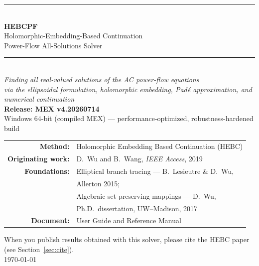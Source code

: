 \documentclass[11pt,a4paper]{article}
\begin{document}
\begin{titlepage}
\centering
\vspace*{2.2cm}
{\color{rule}\rule{\textwidth}{1.2pt}}\\[8pt]
{\Huge\bfseries HEBCPF}\\[10pt]
{\LARGE Holomorphic-Embedding-Based Continuation}\\[4pt]
{\LARGE Power-Flow All-Solutions Solver}\\[10pt]
{\color{rule}\rule{\textwidth}{1.2pt}}\\[18pt]
{\large\itshape Finding \emph{all} real-valued solutions of the AC power-flow equations}\\[6pt]
{\large\itshape via the ellipsoidal formulation, holomorphic embedding, Pad\'e approximation, and numerical continuation}\\[26pt]

{\large\bfseries Release: MEX v4.20260714}\\[4pt]
{\large Windows 64-bit (compiled MEX) --- performance-optimized, robustness-hardened build}\\[30pt]

\begin{tabular}{rl}
\textbf{Method:} & Holomorphic Embedding Based Continuation (HEBC)\\[3pt]
\textbf{Originating work:} & D.\ Wu and B.\ Wang, \emph{IEEE Access}, 2019\\[6pt]
\textbf{Foundations:} & Elliptical branch tracing --- B.\ Lesieutre \& D.\ Wu,\\[1pt]
                      & Allerton 2015;\\[3pt]
                      & Algebraic set preserving mappings --- D.\ Wu,\\[1pt]
                      & Ph.D.\ dissertation, UW--Madison, 2017\\[6pt]
\textbf{Document:} & User Guide and Reference Manual\\
\end{tabular}

\vfill
{\small When you publish results obtained with this solver, please cite the HEBC
paper (see Section~\ref{sec:cite}).}\\[6pt]
{\small\today}
\end{titlepage}

\clearpage
{}
\tableofcontents
\newpage

\end{document}
